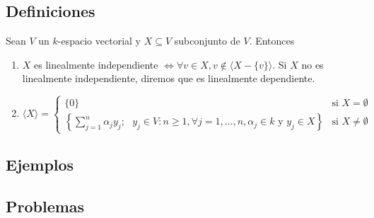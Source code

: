 \subsection{Definiciones}
Sean \( V \) un \( k \)-espacio vectorial y \( X \subseteq V \) subconjunto de \( V \). Entonces

\begin{enumerate}
    \item \( X \) es linealmente independiente \( \Leftrightarrow \forall v \in X, v \not\in \langle X - \{v\} \rangle \).
    Si \( X \) no es linealmente independiente, diremos que es linealmente dependiente.
    
    \item \( \langle X \rangle = 
    \begin{cases} 
    \{0\} & \text{si } X = \emptyset \\
    \left\{ \sum_{j=1}^{n} \alpha_j y_j ; \text{ } y_j \in V : n \geq 1, \forall j = 1, \ldots, n, \alpha_j \in k \text{ y } y_j \in X \right\} & \text{si } X \neq \emptyset 
    \end{cases}
    \)
\end{enumerate}


\subsection*{Ejemplos}

\subsection*{Problemas}